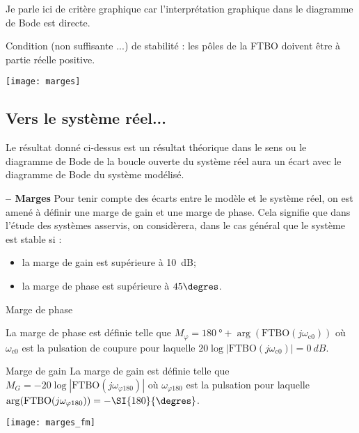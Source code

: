  \begin{rem}
 Je parle ici de critère graphique car l'interprétation graphique dans le diagramme de Bode est directe.
 \end{rem}
 
\begin{resultat}
Condition (non suffisante ...) de stabilité : les pôles de la FTBO doivent être à partie réelle positive.
\end{resultat}
 
\begin{center}
\texttt{[image: marges]}
\end{center} 
\subsection{Vers le système réel...}

Le résultat donné ci-dessus est un résultat théorique dans le sens ou le diagramme de Bode de la boucle ouverte du système réel aura un écart avec le diagramme de Bode du système modélisé. 


\begin{resultat}\textbf{ -- Marges}
Pour tenir compte des écarts entre le modèle et le système réel, on est amené à définir une marge de gain et une marge de phase. Cela signifie que dans l'étude des systèmes asservis, on considèrera, dans le cas général que le système est stable si :
\begin{itemize}
\item la marge de gain est supérieure à \SI{10}{dB};
\item la marge de phase est supérieure à $45\degres$.
\end{itemize}
\end{resultat}

\begin{minipage}[c]{.58\linewidth}
\begin{defi}{Marge de phase}

La marge de phase est définie telle que $M_\varphi= \SI{180}{\degree} + \arg\left(\text{FTBO}(j\omega_{\text{c0}})\right)$ où $\omega_{\text{c0}}$ est la pulsation de coupure pour laquelle $20\log|\text{FTBO}\left(j\omega_{\text{c0}}\right)|=\SI{0}{dB}$.
\end{defi}

\begin{defi}{Marge de gain}
La marge de gain est définie telle
que $M_G = -20\log|\text{FTBO} (j\omega_{\varphi 180})|$
où $\omega_{\varphi 180}$ est la pulsation pour laquelle $\arg(\text{FTBO}(j\omega_{ \varphi 180}))= -\SI{180}{\degres}$.
\end{defi}
\end{minipage}\hfill
\begin{minipage}[c]{.4\linewidth}
\begin{center}
\texttt{[image: marges\_fm]}
\end{center}
\end{minipage}


